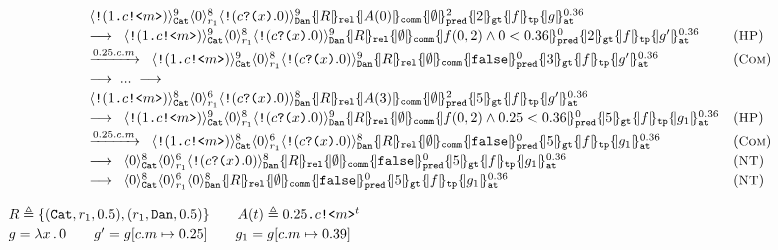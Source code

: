 {\footnotesize
\[
\begin{array}{ll}
\Cella{\comp{(\qsend{1}{c}{m}})}{9}{\cn{Cat}}
\Cella{0}{8}{r_1}
\Cella{\comp{(\qrev{c}{x}.0)}}{9}{\cn{Dan}} 
\qcell{R}{\cn{rel}}
\qcell{A(0)}{\cn{comm}}
\pcell{\emptyset}{2}{\cn{pred}}
\qcell{2}{\cn{gt}}
\qcell{f}{\cn{tp}}
\pcell{g}{0.36}{\cn{at}}
\\[0.2em]
\longrightarrow\;\;
\Cella{\comp{(\qsend{1}{c}{m}})}{9}{\cn{Cat}}
\Cella{0}{8}{r_1}
\Cella{\comp{(\qrev{c}{x}.0)}}{9}{\cn{Dan}} 
\qcell{R}{\cn{rel}}
\qcell{\emptyset}{\cn{comm}}
\pcell{f(0,2)\wedge 0 < 0.36}{0}{\cn{pred}}
\qcell{2}{\cn{gt}}
\qcell{f}{\cn{tp}}
\pcell{g'}{0.36}{\cn{at}}
&
(\rulelab{HP})
\\[0.2em]
\xrightarrow{0.25.c.m}  \;\;
\Cella{\comp{(\qsend{1}{c}{m}})}{9}{\cn{Cat}}
\Cella{0}{8}{r_1}
\Cella{\comp{(\qrev{c}{x}.0)}}{9}{\cn{Dan}} 
\qcell{R}{\cn{rel}}
\qcell{\emptyset}{\cn{comm}}
\pcell{\cn{false}}{0}{\cn{pred}}
\qcell{3}{\cn{gt}}
\qcell{f}{\cn{tp}}
\pcell{g'}{0.36}{\cn{at}}
&
(\rulelab{Com})
\\[0.2em]
\longrightarrow\;...\;\longrightarrow
\\[0.2em]
\Cella{\comp{(\qsend{1}{c}{m}})}{8}{\cn{Cat}}
\Cella{0}{6}{r_1}
\Cella{\comp{(\qrev{c}{x}.0)}}{8}{\cn{Dan}} 
\qcell{R}{\cn{rel}}
\qcell{A(3)}{\cn{comm}}
\pcell{\emptyset}{2}{\cn{pred}}
\qcell{5}{\cn{gt}}
\qcell{f}{\cn{tp}}
\pcell{g'}{0.36}{\cn{at}}
\\[0.2em]
\longrightarrow\;\;
\Cella{\comp{(\qsend{1}{c}{m}})}{9}{\cn{Cat}}
\Cella{0}{8}{r_1}
\Cella{\comp{(\qrev{c}{x}.0)}}{9}{\cn{Dan}} 
\qcell{R}{\cn{rel}}
\qcell{\emptyset}{\cn{comm}}
\pcell{f(0,2)\wedge 0.25 < 0.36}{0}{\cn{pred}}
\qcell{5}{\cn{gt}}
\qcell{f}{\cn{tp}}
\pcell{g_1}{0.36}{\cn{at}}
&
(\rulelab{HP})
\\[0.2em]
\xrightarrow{0.25.c.m}  \;\;
\Cella{\comp{(\qsend{1}{c}{m}})}{8}{\cn{Cat}}
\Cella{0}{6}{r_1}
\Cella{\comp{(\qrev{c}{x}.0)}}{8}{\cn{Dan}} 
\qcell{R}{\cn{rel}}
\qcell{\emptyset}{\cn{comm}}
\pcell{\cn{false}}{0}{\cn{pred}}
\qcell{5}{\cn{gt}}
\qcell{f}{\cn{tp}}
\pcell{g_1}{0.36}{\cn{at}}
&
(\rulelab{Com})
\\[0.2em]
\longrightarrow  \;\;
\Cella{0}{8}{\cn{Cat}}
\Cella{0}{6}{r_1}
\Cella{\comp{(\qrev{c}{x}.0)}}{8}{\cn{Dan}} 
\qcell{R}{\cn{rel}}
\qcell{\emptyset}{\cn{comm}}
\pcell{\cn{false}}{0}{\cn{pred}}
\qcell{5}{\cn{gt}}
\qcell{f}{\cn{tp}}
\pcell{g_1}{0.36}{\cn{at}}
&
(\rulelab{NT})
\\[0.2em]
\longrightarrow  \;\;
\Cella{0}{8}{\cn{Cat}}
\Cella{0}{6}{r_1}
\Cella{0}{8}{\cn{Dan}} 
\qcell{R}{\cn{rel}}
\qcell{\emptyset}{\cn{comm}}
\pcell{\cn{false}}{0}{\cn{pred}}
\qcell{5}{\cn{gt}}
\qcell{f}{\cn{tp}}
\pcell{g_1}{0.36}{\cn{at}}
&
(\rulelab{NT})
\end{array}
\]
}
{\footnotesize
\begin{center}
$
\begin{array}{l}
R\triangleq\{(\texttt{Cat},r_1,0.5), (r_1,\texttt{Dan},0.5)\}
\qquad
A(t)\triangleq 0.25\texttt{.}c\texttt{!<}m\texttt{>}^t
\\[0.2em]
g=\lambda x\,.\,0
\qquad
g'=g[c.m \mapsto 0.25]
\qquad
g_1=g[c.m \mapsto 0.39]
\end{array}
$
\end{center}
}

